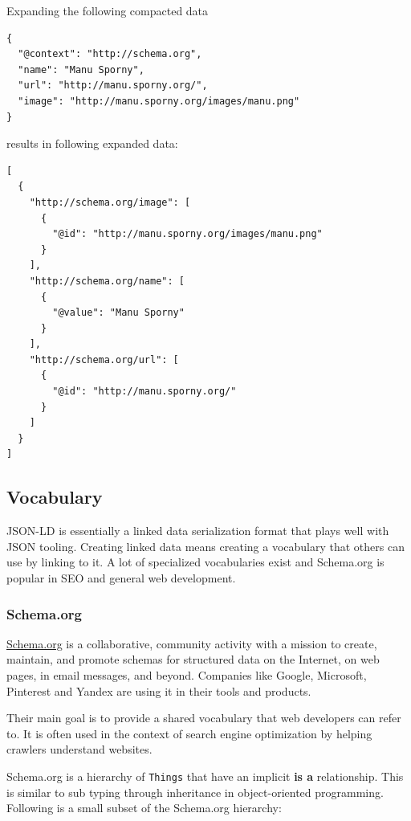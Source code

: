 Expanding the following compacted data

\lstset{language=JSON}
\begin{lstlisting}[caption=Compacted and easy-to-read data of a person]
{
  "@context": "http://schema.org",
  "name": "Manu Sporny",
  "url": "http://manu.sporny.org/",
  "image": "http://manu.sporny.org/images/manu.png"
}
\end{lstlisting}

results in following expanded data:

\lstset{language=JSON}
\begin{lstlisting}[caption=Expanded data of a person that is easy to process for machines]
[
  {
    "http://schema.org/image": [
      {
        "@id": "http://manu.sporny.org/images/manu.png"
      }
    ],
    "http://schema.org/name": [
      {
        "@value": "Manu Sporny"
      }
    ],
    "http://schema.org/url": [
      {
        "@id": "http://manu.sporny.org/"
      }
    ]
  }
]
\end{lstlisting}

\subsection{Vocabulary}
JSON-LD is essentially a linked data serialization format that plays well with JSON tooling. Creating linked data means creating a vocabulary that others can use by linking to it. A lot of specialized vocabularies exist and Schema.org is popular in SEO and general web development.

\subsubsection{Schema.org}
\url{Schema.org} is a collaborative, community activity with a mission to create, maintain, and promote schemas for structured data on the Internet, on web pages, in email messages, and beyond. \citep{welcomeschemaorg} Companies like Google, Microsoft, Pinterest and Yandex are using it in their tools and products.

Their main goal is to provide a shared vocabulary that web developers can refer to. It is often used in the context of search engine optimization by helping crawlers understand websites.

Schema.org is a hierarchy of \lstinline{Things} that have an implicit \textbf{is a} relationship. This is similar to sub typing through inheritance in object-oriented programming. Following is a small subset of the Schema.org hierarchy:

